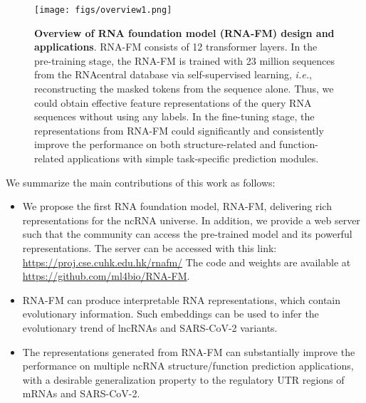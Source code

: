 \begin{figure}[!t]
\centering
\texttt{[image: figs/overview1.png]} 
\caption{
\textbf{Overview of RNA foundation model (RNA-FM) design and applications}. RNA-FM consists of 12 transformer layers. In the pre-training stage, the RNA-FM is trained with 23 million sequences from the RNAcentral database via self-supervised learning, \textit{i.e.}, reconstructing the masked tokens from the sequence alone. 
Thus, we could obtain effective feature representations of the query RNA sequences without using any labels.
In the fine-tuning stage, the representations from RNA-FM could significantly and consistently improve the performance on both structure-related and function-related applications with simple task-specific prediction modules.
} 
\label{Fig.overview}
\end{figure}



We summarize the main contributions of this work as follows:
\begin{itemize}
\item We propose the first RNA foundation model, RNA-FM, delivering rich representations for the ncRNA universe. In addition, we provide a web server such that the community can access the pre-trained model and its powerful representations. The server can be accessed with this link: \href{https://proj.cse.cuhk.edu.hk/rnafm/}{https://proj.cse.cuhk.edu.hk/rnafm/} The code and weights are available at \href{https://github.com/ml4bio/RNA-FM}{https://github.com/ml4bio/RNA-FM}. 

\item RNA-FM can produce interpretable RNA representations, which contain evolutionary information. Such embeddings can be used to infer the evolutionary trend of lncRNAs and SARS-CoV-2 variants.

\item The representations generated from RNA-FM can substantially improve the performance on multiple ncRNA structure/function prediction applications, with a desirable generalization property to the regulatory UTR regions of mRNAs and SARS-CoV-2.


\end{itemize}